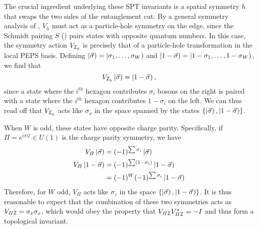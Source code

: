 The crucial ingredient underlying these SPT invariants is a spatial symmetry $h$ that swaps the 
two sides of the entanglement cut. 
By a general symmetry analysis of , $V_h$ must act as a 
particle-hole symmetry on the edge, since the Schmidt pairing $S$ () pairs states with
opposite quantum numbers. In this case, the symmetry action $V_{\mathcal{I}_y}$ is precisely
that of a particle-hole transformation in the local PEPS basis. 
Defining $\left |\vec{\sigma} \right )=\left |\sigma_1,\ldots,\sigma_W \right )$
and $\left |1-\vec{\sigma} \right )=\left |1-\sigma_1,\ldots,1-\sigma_W \right )$, we find that
\begin{equation}
V_{\mathcal{I}_y}\left |\vec{\sigma} \right ) = \left |1-\vec{\sigma} \right ), 
\end{equation}
since a state where the $i^{th}$ hexagon contributes $\sigma_i$ bosons on the right is paired with
a state where the $i^{th}$ hexagon contributes $1-\sigma_i$ on the left. We can thus read off
that $V_{\mathcal{I}_y}$ acts like $\sigma_x$ in the space spanned by the states
$\lbrace \left |\vec{\sigma} \right ), \left |1-\vec{\sigma} \right ) \rbrace$.

When $W$ is odd, these states have opposite charge parity. Specifically, if $\varPi = e^{i \pi \mathcal{Q}} \in U(1)$
is the charge parity symmetry, we have
\begin{align}
V_{\varPi} \left |\vec{\sigma} \right ) &= (-1)^{\sum \sigma_i} \left |\vec{\sigma} \right ) \\
V_{\varPi} \left |1-\vec{\sigma} \right ) &= (-1)^{\sum (1-\sigma_i) } \left |1-\vec{\sigma} \right ) \\ &= (-1)^W (-1)^{\sum \sigma_i} \left |1-\vec{\sigma} \right )
\end{align}
Therefore, for $W$ odd, $V_{\varPi}$ acts like $\sigma_z$ in the space $\lbrace \left |\vec{\sigma} \right ), \left |1-\vec{\sigma} \right ) \rbrace$.
It is thus reasonable to expect that the combination of these two symmetries acts as $V_{\varPi \mathcal{I}} = \sigma_x \sigma_z$,
which would obey the property that $V_{\varPi \mathcal{I}} V_{\varPi \mathcal{I}}^* = -I$ and thus form a topological invariant.

